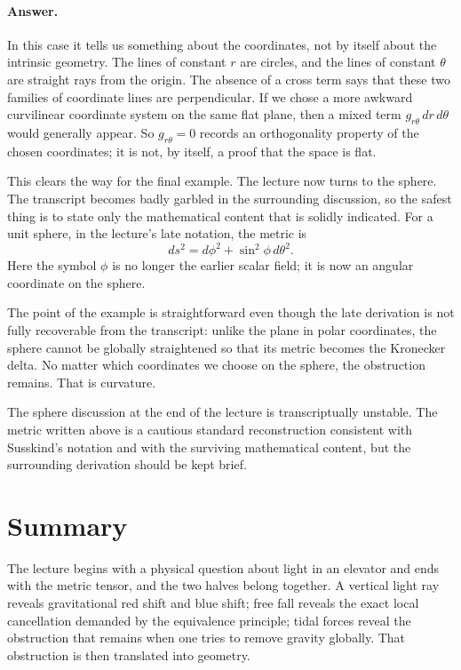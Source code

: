 \paragraph{Answer.} In this case it tells us something about the coordinates, not by itself about the intrinsic geometry. The lines of constant \(r\) are circles, and the lines of constant \(\theta\) are straight rays from the origin. The absence of a cross term says that these two families of coordinate lines are perpendicular. If we chose a more awkward curvilinear coordinate system on the same flat plane, then a mixed term \(g_{r\theta}\,dr\,d\theta\) would generally appear. So \(g_{r\theta}=0\) records an orthogonality property of the chosen coordinates; it is not, by itself, a proof that the space is flat.

This clears the way for the final example. The lecture now turns to the sphere. The transcript becomes badly garbled in the surrounding discussion, so the safest thing is to state only the mathematical content that is solidly indicated. For a unit sphere, in the lecture's late notation, the metric is
\begin{equation}
ds^{2}=d\phi^{2}+\sin^{2}\phi\,d\theta^{2}.
\end{equation}
Here the symbol \(\phi\) is no longer the earlier scalar field; it is now an angular coordinate on the sphere.

The point of the example is straightforward even though the late derivation is not fully recoverable from the transcript: unlike the plane in polar coordinates, the sphere cannot be globally straightened so that its metric becomes the Kronecker delta. No matter which coordinates we choose on the sphere, the obstruction remains. That is curvature.

\begin{remark}
The sphere discussion at the end of the lecture is transcriptually unstable. The metric written above is a cautious standard reconstruction consistent with Susskind's notation and with the surviving mathematical content, but the surrounding derivation should be kept brief.
\end{remark}

\section{Summary}

The lecture begins with a physical question about light in an elevator and ends with the metric tensor, and the two halves belong together. A vertical light ray reveals gravitational red shift and blue shift; free fall reveals the exact local cancellation demanded by the equivalence principle; tidal forces reveal the obstruction that remains when one tries to remove gravity globally. That obstruction is then translated into geometry.

